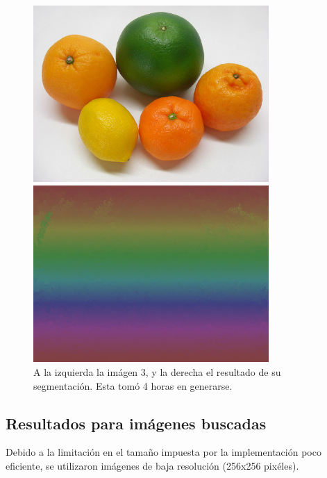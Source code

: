 \documentclass[letterpaper,11pt]{article} %
\begin{document}
    \begin{figure}[H]
      \centering
      \begin{minipage}{0.4\textwidth}
        \includegraphics[width=0.8\textwidth]{images/image_3}
      \end{minipage}
      \begin{minipage}{0.4\textwidth}
        \includegraphics[width=0.8\textwidth]{images/result_image3}
      \end{minipage}
      \caption{A la izquierda la imágen 3, y la derecha el resultado de su segmentación. Esta tomó 4 horas en generarse.}
    \end{figure}

    \subsection{Resultados para imágenes buscadas}
      Debido a la limitación en el tamaño impuesta por la implementación poco eficiente, se utilizaron imágenes de baja resolución (256x256 pixéles).
\end{document}
